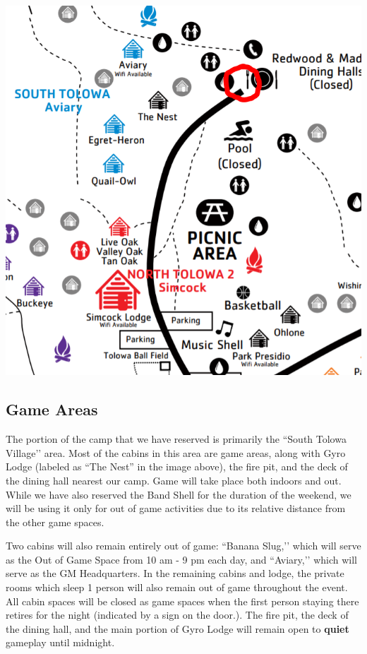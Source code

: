 \documentclass[sheet]{GL2020}
\begin{document}
\begin{center}
\includegraphics[scale=0.7]{CampMap}
\end{center}

\subsection{Game Areas}
The portion of the camp that we have reserved is primarily the ``South Tolowa Village’’ area. Most of the cabins in this area are game areas, along with Gyro Lodge (labeled as ``The Nest'' in the image above), the fire pit, and the deck of the dining hall nearest our camp. Game will take place both indoors and out. While we have also reserved the Band Shell for the duration of the weekend, we will be using it only for out of game activities due to its relative distance from the other game spaces.

Two cabins will also remain entirely out of game: ``Banana Slug,’’ which will serve as the Out of Game Space from 10 am - 9 pm each day, and ``Aviary,’’ which will serve as the GM Headquarters. In the remaining cabins and lodge, the private rooms which sleep 1 person will also remain out of game throughout the event. All cabin spaces will be closed as game spaces when the first person staying there retires for the night (indicated by a sign on the door.). The fire pit, the deck of the dining hall, and the main portion of Gyro Lodge will remain open to \textbf{quiet} gameplay until midnight.
\end{document}
